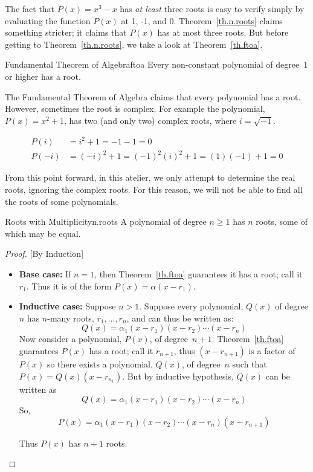 The fact that $P(x) = x^3 - x$ has \emph{at least} three roots is easy
to verify simply by evaluating the function $P(x)$ at 1, -1, and 0.
Theorem~\ref{th.n.roots} claims something stricter; it claims that $P(x)$
has at most three roots.  But before getting to Theorem~\ref{th.n.roots}, we take a look at Theorem~\ref{th.ftoa}.


\begin{theorem}{Fundamental Theorem of Algebra}{ftoa}
  Every non-constant polynomial of degree~1 or higher has a root.
\end{theorem}

The Fundamental Theorem of Algebra claims that every polynomial has a root.
However, sometimes the root is complex.  For example the polynomial,
$P(x) = x^2 + 1$, has two (and only two) complex roots, where $i=\sqrt{-1}$.

\begin{align*}
  P(i) &= i^2 + 1 
  = -1 - 1 
  = 0\\[3pt]
  P(-i) &= (-i)^2 + 1 
  = (-1)^2(i)^2 + 1 = (1)(-1) + 1
  = 0
\end{align*}


From this point forward, in this atelier, we only
attempt to determine the real roots, ignoring the complex roots.  For
this reason, we will not be able to find all the roots of some
polynomials.

\begin{theorem}{Roots with Multiplicity}{n.roots}
  A polynomial of degree $n\ge 1$ has $n$ roots, some of which may be
  equal.
\end{theorem}
\begin{proof}

  [By Induction]
  
  \begin{itemize}
    
  \item \textbf{Base case:} If $n=1$, then Theorem~\ref{th.ftoa}
    guarantees it has a root; call it $r_1$.  Thus it is of the form
    $P(x)=\alpha (x-r_1)$.
  \item \textbf{Inductive case:} Suppose $n>1$.  Suppose every
    polynomial, $Q(x)$ of degree $n$ has $n$-many roots,
    $r_1,\ldots,r_n$, and can thus be written as:
    \[Q(x) = \alpha_1 (x - r_1) (x - r_2) \cdots (x - r_n)\]
    Now consider a polynomial, $P(x)$, of
    degree~$n+1$.  Theorem~\ref{th.ftoa} guarantees $P(x)$ has a root;
    call it $r_{n+1}$, thus $(x-r_{n+1})$ is a factor of $P(x)$ so there
    exists a polynomial, $Q(x)$, of degree~$n$ such that
    $P(x) =  Q(x) (x-r_{n_1})$.
    But by inductive hypothesis, $Q(x)$ can be written
    as \[Q(x) = \alpha_1 (x - r_1) (x - r_2) \cdots (x - r_n)\]
    So, \[P(x) = \alpha_1 (x - r_1) (x - r_2) \cdots (x - r_n) (x-r_{n+1})\]

    Thus $P(x)$ has $n+1$ roots.
  \end{itemize}
\end{proof}

